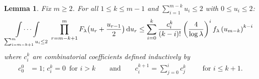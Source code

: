 \documentclass[a4paper,reqno,11pt]{amsart}
\numberwithin{equation}{section}
\theoremstyle{mytheorem}
\newtheorem{lemma}[theorem]{Lemma}
\newcommand{\gl}{\lambda}
\newcommand\ra{\left(}
\newcommand\rb{\right)}
\newcommand\dd{\mathrm{d}}
\begin{document}
{\begin{lemma}\label{u2}
    Fix $m\ge 2$. For all $1\le k\le m-1$ and $\sum^{m-k}_{i=1}u_i\le 2$ with $0\le u_i \le 2$:
    \begin{equation}
        \idotsint\limits_{\sum^m_{i=m-k+1}u_i \le 2} \,\,
        \prod^m_{r=m-k+1}   F_\gl\big(u_r+\frac{u_{r-1}}{2}\big) \,\dd u_r
        \le 
        \sum^k_{i=0}\frac{c^k_i}{(k-i)!}
        \ra
        \frac{4}{\log\gl}
        \rb^i
        f_\gl
        \ra
         u_{m-k}
        \rb^{k-i}
    \end{equation}
 where $c^k_i$ are combinatorial coefficients defined inductively by
\begin{align}\label{def of c^k_i}
     c^0_0 &=1; \, c^k_i=0\,\text{ for $i>k$} \qquad \text{and}\qquad
     c^{k+1}_i = \sum^{i}_{j=0}c^k_j\qquad \text{ for $i\le k+1$}.
\end{align}


\end{lemma}}
\end{document}

